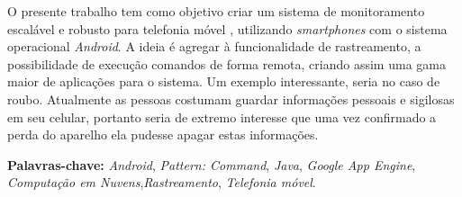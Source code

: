 \begin{resumo}

    O presente trabalho tem como objetivo criar um sistema de monitoramento escalável e robusto para telefonia móvel , utilizando \emph{smartphones} com o sistema operacional \emph{Android}. A ideia é agregar à funcionalidade 
de rastreamento, a possibilidade de execução comandos de forma remota, criando assim uma gama maior de aplicações para o sistema. Um exemplo interessante, seria no caso de roubo. Atualmente as pessoas costumam guardar 
informações pessoais e sigilosas  em seu celular, portanto seria de extremo interesse que uma vez confirmado a perda do aparelho ela pudesse apagar estas informações.
    
    \par
    \textbf{Palavras-chave:} \emph{Android}, \emph{Pattern: Command}, \emph{Java}, \emph{Google App Engine}, \emph{Computação em Nuvens},\emph{Rastreamento}, \emph{Telefonia móvel}.
\end{resumo}
